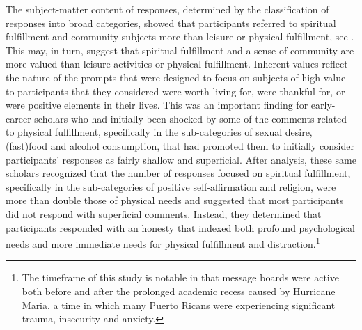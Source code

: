 \documentclass[output=paper,colorlinks,citecolor=brown]{langscibook}
\begin{document}
The subject-matter content of responses, determined by the classification of responses into broad categories, showed that participants referred to spiritual fulfillment and community subjects more than leisure or physical fulfillment, see . This may, in turn, suggest that spiritual fulfillment and a sense of community are more valued than leisure activities or physical fulfillment. Inherent values reflect the nature of the prompts that were designed to focus on subjects of high value to participants that they considered were worth living for, were thankful for, or were positive elements in their lives. This was an important finding for early-career scholars who had initially been shocked by some of the comments related to physical fulfillment, specifically in the sub-categories of sexual desire, (fast)food and alcohol consumption, that had promoted them to initially consider participants’ responses as fairly shallow and superficial. After analysis, these same scholars recognized that the number of responses focused on spiritual fulfillment, specifically in the sub-categories of positive self-affirmation and religion, were more than double those of physical needs and suggested that most participants did not respond with superficial comments. Instead, they determined that participants responded with an honesty that indexed both profound psychological needs and more immediate needs for physical fulfillment and distraction.\footnote{The timeframe of this study is notable in that message boards were active both before and after the prolonged academic recess caused by Hurricane Maria, a time in which many Puerto Ricans were experiencing significant trauma, insecurity and anxiety.}

\begin{table}[!ht]
\centering
\setlength{\tabcolsep}{3pt}
\caption{Summary of data on message-boards classified by content of responses}
\label{tab:tab4_07}
\end{table}
\end{document}
